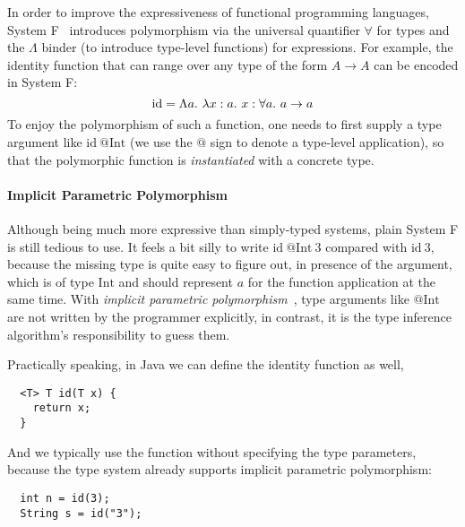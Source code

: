 In order to improve the expressiveness of functional programming languages,
System F~\citep{GIRARD1971UseExt,girard1972interpretation,reynolds1974towards}
introduces polymorphism via the universal quantifier $\forall$ for types
and the $\Lambda$ binder (to introduce type-level functions) for expressions.
For example, the identity function that can range over any type of the form $A \to A$
can be encoded in System F:
$$\text{id} = \Lambda a.~\lam[x:a]x : \all a \to a$$
To enjoy the polymorphism of such a function,
one needs to first supply a type argument like $\text{id}~@\text{Int}$
(we use the $@$ sign to denote a type-level application),
so that the polymorphic function is \emph{instantiated} with
a concrete type.

\paragraph{Implicit Parametric Polymorphism}

Although being much more expressive than simply-typed systems,
plain System F is still tedious to use.
It feels a bit silly to write $\text{id}~@\text{Int}~3$ compared with $\text{id}~3$,
because the missing type is quite easy to figure out,
in presence of the argument, which is of type $\text{Int}$ and
should represent $a$ for the function application at the same time.
With \emph{implicit parametric polymorphism}~\citep{milner1978theory},
type arguments like $@\text{Int}$ are not written by the programmer explicitly,
in contrast, it is the type inference algorithm's responsibility to guess them.

Practically speaking, in Java we can define the identity function as well,
\begin{verbatim}
  <T> T id(T x) {
    return x;
  }
\end{verbatim}
And we typically use the function without specifying the type parameters,
because the type system already supports implicit parametric polymorphism:
\begin{verbatim}
  int n = id(3);
  String s = id("3");
\end{verbatim}

